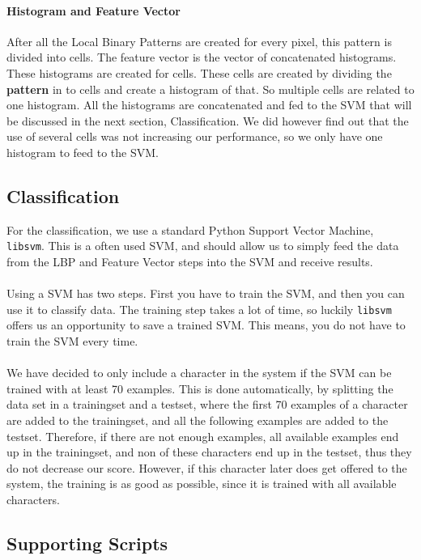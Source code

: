 \documentclass[a4paper]{article}
\begin{document}
\paragraph*{Histogram and Feature Vector}
After all the Local Binary Patterns are created for every pixel, this pattern
is divided into cells. The feature vector is the vector of concatenated
histograms. These histograms are created for cells. These cells are created by
dividing the \textbf{pattern} in to cells and create a histogram of that. So
multiple cells are related to one histogram. All the histograms are
concatenated and fed to the SVM that will be discussed in the next section,
Classification. We did however find out that the use of several cells was not
increasing our performance, so we only have one histogram to feed to the SVM.

\subsection{Classification}

For the classification, we use a standard Python Support Vector Machine,
\texttt{libsvm}. This is a often used SVM, and should allow us to simply feed
the data from the LBP and Feature Vector steps into the SVM and receive
results.\\
\\
Using a SVM has two steps. First you have to train the SVM, and then you can
use it to classify data. The training step takes a lot of time, so luckily
\texttt{libsvm} offers us an opportunity to save a trained SVM. This means,
you do not have to train the SVM every time.\\
\\
We have decided to only include a character in the system if the SVM can be
trained with at least 70 examples. This is done automatically, by splitting
the data set in a trainingset and a testset, where the first 70 examples of
a character are added to the trainingset, and all the following examples are
added to the testset. Therefore, if there are not enough examples, all
available examples end up in the trainingset, and non of these characters
end up in the testset, thus they do not decrease our score. However, if this
character later does get offered to the system, the training is as good as
possible, since it is trained with all available characters.

\subsection{Supporting Scripts}
\end{document}
